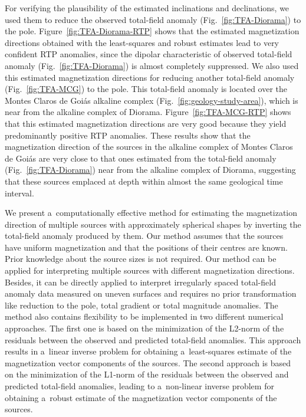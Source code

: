 \documentclass[journal abbreviation, npg]{copernicus}
\begin{document}
For verifying the plausibility of the estimated inclinations and
declinations, we used them to reduce the observed total-field anomaly
(Fig.~\ref{fig:TFA-Diorama}) to the pole. Figure~\ref{fig:TFA-Diorama-RTP}
shows that the estimated magnetization directions obtained with the
least-squares and robust estimates lead to very confident RTP anomalies,
since the dipolar characteristic of observed total-field anomaly
(Fig.~\ref{fig:TFA-Diorama}) is almost completely suppressed. We also used
this estimated magnetization directions for reducing another total-field
anomaly (Fig.~\ref{fig:TFA-MCG}) to the pole. This total-field anomaly is
located over the Montes Claros de Goi\'{a}s alkaline complex
(Fig.~\ref{fig:geology-study-area}), which is near from the alkaline complex
of Diorama. Figure~\ref{fig:TFA-MCG-RTP} shows that this estimated
magnetization directions are very good because they yield predominantly
positive RTP anomalies. These results show that the magnetization direction
of the sources in the alkaline complex of Montes Claros de Goi\'{a}s are very
close to that ones estimated from the total-field anomaly
(Fig.~\ref{fig:TFA-Diorama}) near from the alkaline complex of Diorama,
suggesting that these sources emplaced at depth within almost the same
geological time interval.

\conclusions We present a~computationally effective method for estimating the
magnetization direction of multiple sources with approximately spherical
shapes by inverting the total-field anomaly produced by them. Our method
assumes that the sources have uniform magnetization and that the positions of
their centres are known. Prior knowledge about the source sizes is not
required. Our method can be applied for interpreting multiple sources with
different magnetization directions. Besides, it can be directly applied to
interpret irregularly spaced total-field anomaly data measured on uneven
surfaces and requires no prior transformation like reduction to the pole,
total gradient or total magnitude anomalies. The method also contains
flexibility to be implemented in two different numerical approaches. The
first one is based on the minimization of the L2-norm of the residuals
between the observed and predicted total-field anomalies. This approach
results in a~linear inverse problem for obtaining a~least-squares estimate of
the magnetization vector components of the sources. The second approach is
based on the minimization of the L1-norm of the residuals between the
observed and predicted total-field anomalies, leading to a~non-linear inverse
problem for obtaining a~robust estimate of the magnetization vector
components of the sources.
\end{document}
